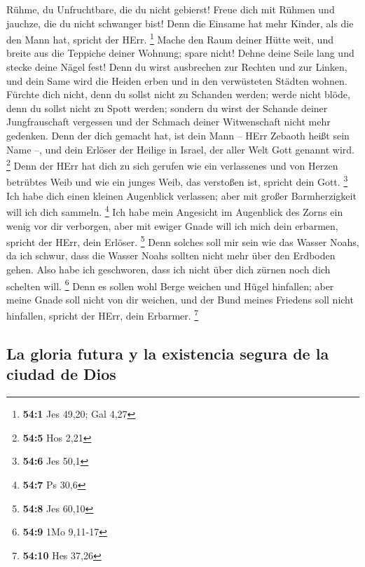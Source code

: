  Rühme, du Unfruchtbare, die du nicht gebierst! Freue dich
mit Rühmen und jauchze, die du nicht schwanger bist! Denn die Einsame
hat mehr Kinder, als die den Mann hat, spricht der HErr. \footnote{\textbf{54:1}
  Jes 49,20; Gal 4,27}  Mache den Raum deiner Hütte weit,
und breite aus die Teppiche deiner Wohnung; spare nicht! Dehne deine
Seile lang und stecke deine Nägel fest!  Denn du wirst
ausbrechen zur Rechten und zur Linken, und dein Same wird die Heiden
erben und in den verwüsteten Städten wohnen.  Fürchte dich
nicht, denn du sollst nicht zu Schanden werden; werde nicht blöde, denn
du sollst nicht zu Spott werden; sondern du wirst der Schande deiner
Jungfrauschaft vergessen und der Schmach deiner Witwenschaft nicht mehr
gedenken.  Denn der dich gemacht hat, ist dein Mann --
HErr Zebaoth heißt sein Name --, und dein Erlöser der Heilige in Israel,
der aller Welt Gott genannt wird. \footnote{\textbf{54:5} Hos 2,21}
 Denn der HErr hat dich zu sich gerufen wie ein
verlassenes und von Herzen betrübtes Weib und wie ein junges Weib, das
verstoßen ist, spricht dein Gott. \footnote{\textbf{54:6} Jes 50,1}
 Ich habe dich einen kleinen Augenblick verlassen; aber
mit großer Barmherzigkeit will ich dich sammeln. \footnote{\textbf{54:7}
  Ps 30,6}  Ich habe mein Angesicht im Augenblick des
Zorns ein wenig vor dir verborgen, aber mit ewiger Gnade will ich mich
dein erbarmen, spricht der HErr, dein Erlöser. \footnote{\textbf{54:8}
  Jes 60,10}  Denn solches soll mir sein wie das Wasser
Noahs, da ich schwur, dass die Wasser Noahs sollten nicht mehr über den
Erdboden gehen. Also habe ich geschworen, dass ich nicht über dich
zürnen noch dich schelten will. \footnote{\textbf{54:9} 1Mo 9,11-17}
 Denn es sollen wohl Berge weichen und Hügel hinfallen;
aber meine Gnade soll nicht von dir weichen, und der Bund meines
Friedens soll nicht hinfallen, spricht der HErr, dein Erbarmer.
\footnote{\textbf{54:10} Hes 37,26}

\hypertarget{la-gloria-futura-y-la-existencia-segura-de-la-ciudad-de-dios}{%
\subsection{La gloria futura y la existencia segura de la ciudad de
Dios}\label{la-gloria-futura-y-la-existencia-segura-de-la-ciudad-de-dios}}

